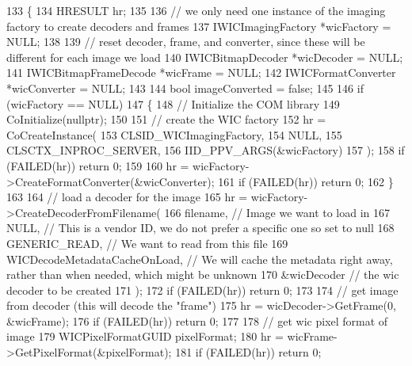 \begin{DoxyCode}
133 \{
134     HRESULT hr;
135 
136     \textcolor{comment}{// we only need one instance of the imaging factory to create decoders and frames}
137     IWICImagingFactory *wicFactory = NULL;
138 
139     \textcolor{comment}{// reset decoder, frame, and converter, since these will be different for each image we load}
140     IWICBitmapDecoder *wicDecoder = NULL;
141     IWICBitmapFrameDecode *wicFrame = NULL;
142     IWICFormatConverter *wicConverter = NULL;
143 
144     \textcolor{keywordtype}{bool} imageConverted = \textcolor{keyword}{false};
145 
146     \textcolor{keywordflow}{if} (wicFactory == NULL)
147     \{
148         \textcolor{comment}{// Initialize the COM library}
149         CoInitialize(\textcolor{keyword}{nullptr});
150 
151         \textcolor{comment}{// create the WIC factory}
152         hr = CoCreateInstance(
153             CLSID\_WICImagingFactory,
154             NULL,
155             CLSCTX\_INPROC\_SERVER,
156             IID\_PPV\_ARGS(&wicFactory)
157         );
158         \textcolor{keywordflow}{if} (FAILED(hr)) \textcolor{keywordflow}{return} 0;
159 
160         hr = wicFactory->CreateFormatConverter(&wicConverter);
161         \textcolor{keywordflow}{if} (FAILED(hr)) \textcolor{keywordflow}{return} 0;
162     \}
163 
164     \textcolor{comment}{// load a decoder for the image}
165     hr = wicFactory->CreateDecoderFromFilename(
166         filename,                        \textcolor{comment}{// Image we want to load in}
167         NULL,                            \textcolor{comment}{// This is a vendor ID, we do not prefer a specific one so set to
       null}
168         GENERIC\_READ,                    \textcolor{comment}{// We want to read from this file}
169         WICDecodeMetadataCacheOnLoad,    \textcolor{comment}{// We will cache the metadata right away, rather than when needed,
       which might be unknown}
170         &wicDecoder                      \textcolor{comment}{// the wic decoder to be created}
171     );
172     \textcolor{keywordflow}{if} (FAILED(hr)) \textcolor{keywordflow}{return} 0;
173 
174     \textcolor{comment}{// get image from decoder (this will decode the "frame")}
175     hr = wicDecoder->GetFrame(0, &wicFrame);
176     \textcolor{keywordflow}{if} (FAILED(hr)) \textcolor{keywordflow}{return} 0;
177 
178     \textcolor{comment}{// get wic pixel format of image}
179     WICPixelFormatGUID pixelFormat;
180     hr = wicFrame->GetPixelFormat(&pixelFormat);
181     \textcolor{keywordflow}{if} (FAILED(hr)) \textcolor{keywordflow}{return} 0;

\end{DoxyCode}
